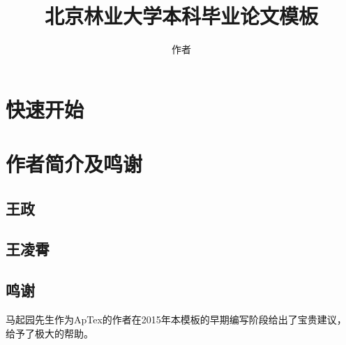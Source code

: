 \documentclass{bjfu}
\title{北京林业大学本科毕业论文模板}
\author{作者}
\begin{document}
\makeBjfuTitlePage
\section{快速开始}
\cite{刘海洋2013LATEX}

\section{作者简介及鸣谢}
\subsection{王政}

\subsection{王凌霄}

\subsection{鸣谢}
马起园先生作为ApTex的作者在2015年本模板的早期编写阶段给出了宝贵建议， 给予了极大的帮助。


\end{document}
